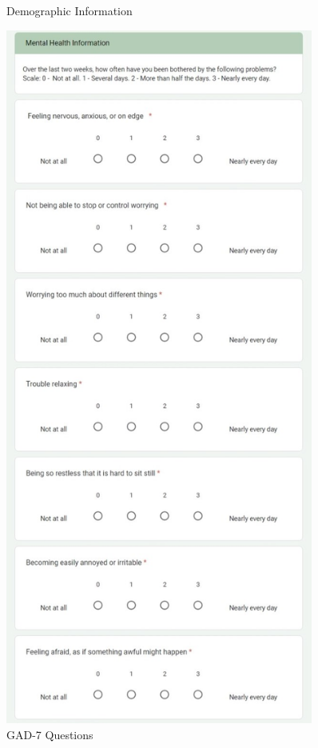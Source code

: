 \documentclass[12pt, english]{article}
\begin{document}
\begin{figure}[h]
\begin{minipage}{0.45\textwidth}
        \caption{Demographic Information}
    \end{minipage}\hfill
    \begin{minipage}{0.45\textwidth}
        \centering
        \includegraphics[width=0.9\textwidth]{images/psy.jpeg} %
        \caption{GAD-7 Questions}
    \end{minipage}
\end{figure}
\end{document}
